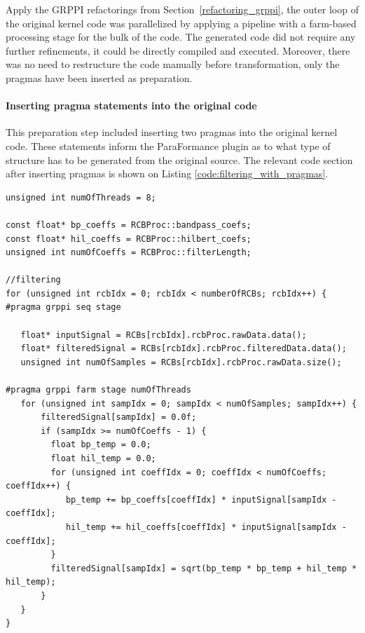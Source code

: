 Apply the GRPPI refactorings from Section~\ref{refactoring_grppi}, the outer loop of the original kernel code was parallelized by applying a pipeline with a farm-based processing stage for the bulk of the code. The generated code did not require any further refinements, it could be directly compiled and executed. Moreover, there was no need to restructure the code manually before transformation, only the pragmas have been inserted as preparation. 

\paragraph{Inserting pragma statements into the original code}
This preparation step included inserting two pragmas into the original kernel code. These statements inform the ParaFormance plugin as to what type of structure has to be generated from the original source. The relevant code section after inserting pragmas is shown on Listing \ref{code:filtering_with_pragmas}.

\begin{small}
\begin{lstlisting}[label=code:filtering_with_pragmas,caption={Original eRDM kernel code with pragma statements}]
unsigned int numOfThreads = 8;

const float* bp_coeffs = RCBProc::bandpass_coefs;
const float* hil_coeffs = RCBProc::hilbert_coefs;
unsigned int numOfCoeffs = RCBProc::filterLength;

//filtering
for (unsigned int rcbIdx = 0; rcbIdx < numberOfRCBs; rcbIdx++) {
#pragma grppi seq stage

   float* inputSignal = RCBs[rcbIdx].rcbProc.rawData.data();
   float* filteredSignal = RCBs[rcbIdx].rcbProc.filteredData.data();
   unsigned int numOfSamples = RCBs[rcbIdx].rcbProc.rawData.size();

#pragma grppi farm stage numOfThreads
   for (unsigned int sampIdx = 0; sampIdx < numOfSamples; sampIdx++) {
       filteredSignal[sampIdx] = 0.0f;
       if (sampIdx >= numOfCoeffs - 1) {
         float bp_temp = 0.0;
         float hil_temp = 0.0;
         for (unsigned int coeffIdx = 0; coeffIdx < numOfCoeffs; coeffIdx++) {
            bp_temp += bp_coeffs[coeffIdx] * inputSignal[sampIdx - coeffIdx];
            hil_temp += hil_coeffs[coeffIdx] * inputSignal[sampIdx - coeffIdx];
         }
         filteredSignal[sampIdx] = sqrt(bp_temp * bp_temp + hil_temp * hil_temp);
       }
   }
}


\end{lstlisting}
\end{small}


